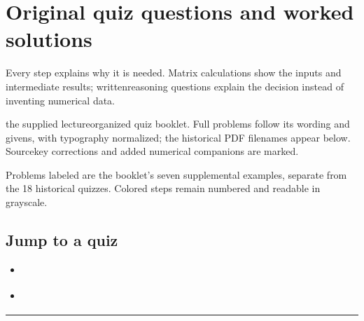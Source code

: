 \documentclass[letterpaper,11pt,english,openany,oneside]{jupyterBook}
\begin{document}
\ignorespaces
\sphinxstepscope


\section{Original quiz questions and worked solutions}
\label{\detokenize{lectures/lecture01/quiz-workbook:original-quiz-questions-and-worked-solutions}}\label{\detokenize{lectures/lecture01/quiz-workbook:lec01-quiz-workbook}}\label{\detokenize{lectures/lecture01/quiz-workbook::doc}}
\sphinxAtStartPar
{} Every step explains why it is needed. Matrix calculations show the inputs and intermediate results; written\sphinxhyphen{}reasoning questions explain the decision instead of inventing numerical data.

\sphinxAtStartPar
{} the supplied lecture\sphinxhyphen{}organized quiz booklet. Full problems follow its wording and givens, with typography normalized; the historical PDF filenames appear below. Source\sphinxhyphen{}key corrections and added numerical companions are marked.

\sphinxAtStartPar
{} Problems labeled  are the booklet’s seven supplemental examples, separate from the 18 historical quizzes. Colored steps remain numbered and readable in grayscale.


\subsection{Jump to a quiz}
\label{\detokenize{lectures/lecture01/quiz-workbook:jump-to-a-quiz}}\begin{itemize}
\item {}
\sphinxAtStartPar
{\hyperref[\detokenize{lectures/lecture01/quiz-workbook:quiz-source-17}]{}}

\item {}
\sphinxAtStartPar
{\hyperref[\detokenize{lectures/lecture01/quiz-workbook:quiz-source-18}]{}}

\end{itemize}


\bigskip\hrule\bigskip
\end{document}
